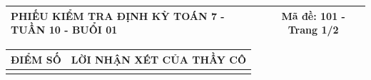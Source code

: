 \documentclass[12pt,a4paper]{article}
\begin{document}
\pagestyle{empty}
\noindent
\begin{tabularx}{\linewidth}{|X|c|}
\hline
\textbf{PHIẾU KIỂM TRA ĐỊNH KỲ TOÁN 7 - TUẦN 10 - BUỔI 01} & \textbf{Mã đề: 101 - Trang 1/2} \\
\hline
\end{tabularx}

\vspace{1.2mm}

\noindent
\begin{tabularx}{\linewidth}{|p{3.2cm}|X|}
\hline
\centering\textbf{ĐIỂM SỐ} & \centering\textbf{LỜI NHẬN XÉT CỦA THẦY CÔ} \tabularnewline
\hline
\rule{0pt}{1.8cm} & \tabularnewline
\hline
\end{tabularx}
\end{document}
